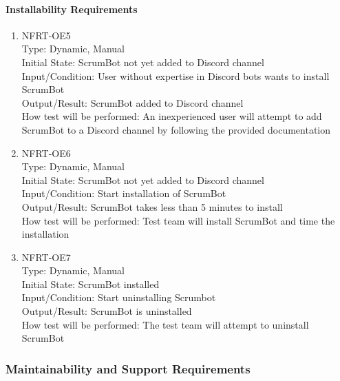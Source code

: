 \documentclass[12pt, titlepage]{article}
\begin{document}
\paragraph{Installability Requirements}
\begin{enumerate}

\item{NFRT-OE5}\\
Type: Dynamic, Manual\\
Initial State: ScrumBot not yet added to Discord channel\\
Input/Condition: User without expertise in Discord bots wants to install ScrumBot\\
Output/Result: ScrumBot added to Discord channel\\
How test will be performed: An inexperienced user will attempt to add ScrumBot to a Discord channel by following the provided documentation

\item{NFRT-OE6}\\
Type: Dynamic, Manual\\
Initial State: ScrumBot not yet added to Discord channel\\
Input/Condition: Start installation of ScrumBot\\
Output/Result: ScrumBot takes less than 5 minutes to install\\
How test will be performed: Test team will install ScrumBot and time the installation

\item{NFRT-OE7}\\
Type: Dynamic, Manual\\
Initial State: ScrumBot installed\\
Input/Condition: Start uninstalling Scrumbot\\
Output/Result: ScrumBot is uninstalled\\
How test will be performed: The test team will attempt to uninstall ScrumBot
\end{enumerate}


\subsubsection{Maintainability and Support Requirements}
\end{document}
